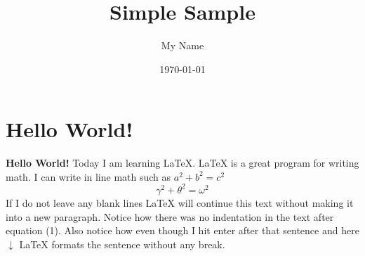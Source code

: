 \documentclass{article}
\title{Simple Sample}
\author{My Name}
\date{\today}
\begin{document}
    \maketitle

    \section{Hello World!}

    \textbf{Hello World!} Today I am learning \LaTeX.
    \LaTeX{} is a great program for writing math. I can write in line math such as $a^2+b^2=c^2$
    \begin{equation}
    \gamma^2+\theta^2=\omega^2
    \end{equation}
    If I do not leave any blank lines \LaTeX{} will continue  this text without making it into a new paragraph.  Notice how there was no indentation in the text after equation (1).
    Also notice how even though I hit enter after that sentence and here $\downarrow$
    \LaTeX{} formats the sentence without any break.
\end{document}
